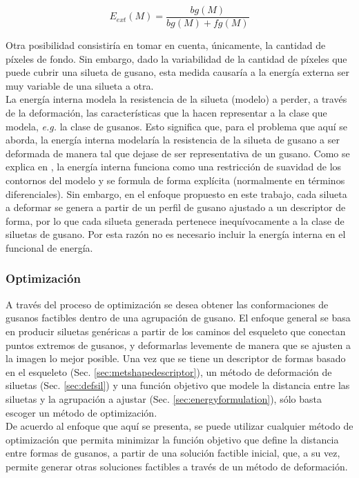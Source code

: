 $$E_{ext}(M) = \frac{bg(M)}{bg(M)+fg(M)}$$

Otra posibilidad consistir\'ia en tomar en cuenta, \'unicamente, la cantidad
de p\'ixeles de fondo. Sin embargo, dado la variabilidad de la cantidad de p\'ixeles
que puede cubrir una silueta de gusano, esta medida causar\'ia a la energ\'ia externa
ser muy variable de una silueta a otra.\\

La energ\'ia interna modela la resistencia de la silueta (modelo) a perder, a trav\'es
de la deformaci\'on, las caracter\'isticas que la hacen representar a la clase que
modela, \emph{e.g.} la clase de gusanos. Esto significa que, para el problema que aqu\'i
se aborda, la energ\'ia interna modelar\'ia la resistencia de la silueta de gusano
a ser deformada de manera tal que dejase de ser representativa de un gusano.
Como se explica en \cite{snakes}, la energ\'ia interna funciona como una restricci\'on de 
suavidad de los contornos del modelo y se formula de forma expl\'icita (normalmente en
t\'erminos diferenciales). Sin embargo, en el enfoque propuesto en este trabajo,
cada silueta a deformar se genera a partir de un perfil de gusano ajustado a un
descriptor de forma, por lo que cada silueta generada pertenece inequ\'ivocamente
a la clase de siluetas de gusano. Por esta raz\'on no es necesario incluir la
energ\'ia interna en el funcional de energ\'ia.

\subsubsection*{Optimizaci\'on}

A trav\'es del  proceso de optimizaci\'on se desea obtener las conformaciones de gusanos factibles
dentro de una agrupaci\'on de gusano. El enfoque general se basa en producir siluetas gen\'ericas
a partir de los caminos del esqueleto que conectan puntos extremos de gusanos, y deformarlas
levemente de manera que se ajusten a la imagen lo mejor posible. 
Una vez que se tiene un descriptor de formas basado en el esqueleto 
(Sec. \ref{sec:metshapedescriptor}), un m\'etodo de deformaci\'on de siluetas 
(Sec. \ref{sec:defsil}) y una funci\'on objetivo que modele la distancia
entre las siluetas y la agrupaci\'on a ajustar (Sec. \ref{sec:energyformulation}), 
s\'olo basta escoger un m\'etodo de optimizaci\'on.\\

De acuerdo al enfoque que aqu\'i se presenta, se puede utilizar cualquier m\'etodo de 
optimizaci\'on que permita minimizar la funci\'on objetivo que define la distancia entre 
formas de gusanos, a partir de una soluci\'on factible inicial, que, a su vez, permite 
generar otras soluciones factibles a trav\'es de un m\'etodo de deformaci\'on.\\

